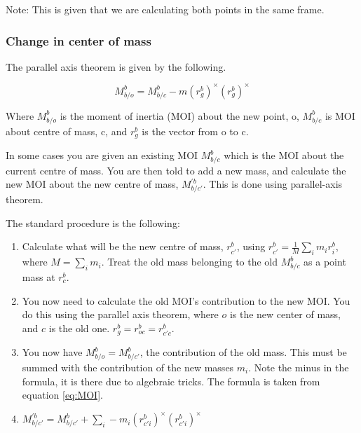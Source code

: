 Note: This is given that we are calculating both points in the same frame.

\subsubsection{Change in center of mass}

The parallel axis theorem is given by the following.

\begin{equation}
\label{eq:p_axis}
    M^b_{b/o}=M^b_{b/c}-m(r^b_g)^\times(r^b_g)^\times
\end{equation}

Where $M^b_{b/o}$ is the moment of inertia (MOI) about the new point, o, $M^b_{b/c}$ is MOI about centre of mass, c, and $r^b_g$ is the vector from o to c. 

In some cases you are given an existing MOI $M^b_{b/c}$ which is the MOI about the current centre of mass. You are then told to add a new mass, and calculate the new MOI about the new centre of mass, $M^{'b}_{b/c'}$. This is done using parallel-axis theorem. 

The standard procedure is the following: 
\begin{enumerate}
    \item Calculate what will be the new centre of mass, $r^b_{c'}$,  using \newline $r^b_{c'}= \frac{1}{M}\sum\limits_{i} m_ir^b_i$,
    where $M=\sum\limits_{i} m_i$. Treat the old mass belonging to the old $M^b_{b/c}$ as a point mass at $r^b_{c}$.
    \item You now need to calculate the old MOI's contribution to the new MOI. You do this using the parallel axis theorem, where $o$ is the new center of mass, and $c$ is the old one. $r^b_g = r^b_{oc} = r^b_{c'c}$. 
    \item You now have $M^b_{b/o} = M^b_{b/c'}$, the contribution of the old mass. This must be summed with the contribution of the new masses $m_i$. Note the minus in the formula, it is there due to algebraic tricks. The formula is taken from equation \ref{eq:MOI}.
    \item $M^{'b}_{b/c'} = M^b_{b/c'} + \sum\limits_{i} -m_i(r^b_{c'i})^\times(r^b_{c'i})^\times$
\end{enumerate}

